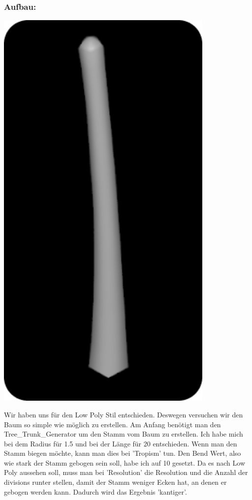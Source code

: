 \documentclass[paper=a4,fontsize=12pt,ngerman]{scrartcl}
\begin{document}
	\subsubsection*{Aufbau:} 
	\begin{minipage}{0.3\textwidth}
		\includegraphics[width=0.8\textwidth]{graphics/Ali3.png}
	\end{minipage}
	\begin{minipage}{0.7\textwidth}
	Wir haben uns für den Low Poly Stil entschieden. Deswegen versuchen wir den Baum so simple wie möglich zu erstellen. Am Anfang benötigt man den Tree\_Trunk\_Generator um den Stamm vom Baum zu erstellen. Ich habe mich bei dem Radius für 1.5 und bei der Länge für 20 entschieden. Wenn man den Stamm biegen möchte, kann man dies bei 'Tropism' tun. Den Bend Wert, also wie stark der Stamm gebogen sein soll, habe ich auf 10 gesetzt.  Da es nach Low Poly aussehen soll, muss man bei 'Resolution' die Resolution und die Anzahl der divisions runter stellen, damit der Stamm weniger Ecken hat, an denen er gebogen werden kann. Dadurch wird das Ergebnis 'kantiger'.
	\end{minipage}
\end{document}
